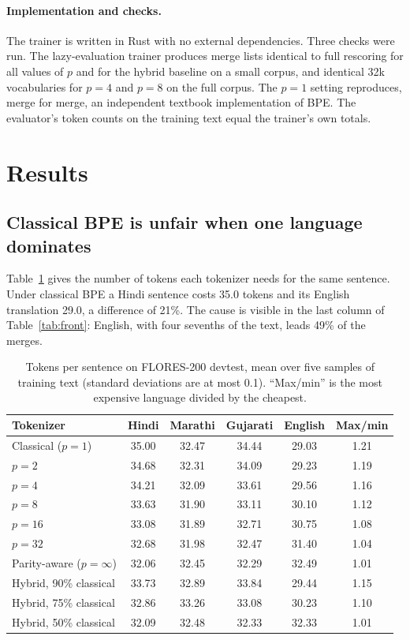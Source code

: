 \documentclass[11pt,a4paper]{article}
\theoremstyle{remark}
\begin{document}
\paragraph{Implementation and checks.}
The trainer is written in Rust with no external dependencies. Three checks were run.
The lazy-evaluation trainer produces merge lists identical to full rescoring for all values
of $p$ and for the hybrid baseline on a small corpus, and identical 32k vocabularies for
$p=4$ and $p=8$ on the full corpus. The $p=1$ setting reproduces, merge for merge, an
independent textbook implementation of BPE. The evaluator's token counts on the training
text equal the trainer's own totals.

\section{Results}\label{sec:results}

\subsection{Classical BPE is unfair when one language dominates}

Table~\ref{tab:perlang} gives the number of tokens each tokenizer needs for the same
sentence. Under classical BPE a Hindi sentence costs 35.0 tokens and its English
translation 29.0, a difference of 21\%. The cause is visible in the last column of
Table~\ref{tab:front}: English, with four sevenths of the text, leads 49\% of the merges.

\begin{table}[t]
\centering
\caption{Tokens per sentence on FLORES-200 devtest, mean over five samples of training
text (standard deviations are at most 0.1). ``Max/min'' is the most expensive language
divided by the cheapest.}
\label{tab:perlang}
\begin{tabular}{lccccc}
\toprule
Tokenizer & Hindi & Marathi & Gujarati & English & Max/min\\
\midrule
Classical ($p=1$) & 35.00 & 32.47 & 34.44 & 29.03 & 1.21\\
$p=2$  & 34.68 & 32.31 & 34.09 & 29.23 & 1.19\\
$p=4$  & 34.21 & 32.09 & 33.61 & 29.56 & 1.16\\
$p=8$  & 33.63 & 31.90 & 33.11 & 30.10 & 1.12\\
$p=16$ & 33.08 & 31.89 & 32.71 & 30.75 & 1.08\\
$p=32$ & 32.68 & 31.98 & 32.47 & 31.40 & 1.04\\
Parity-aware ($p=\infty$) & 32.06 & 32.45 & 32.29 & 32.49 & 1.01\\
\midrule
Hybrid, 90\% classical & 33.73 & 32.89 & 33.84 & 29.44 & 1.15\\
Hybrid, 75\% classical & 32.86 & 33.26 & 33.08 & 30.23 & 1.10\\
Hybrid, 50\% classical & 32.09 & 32.48 & 32.33 & 32.33 & 1.01\\
\bottomrule
\end{tabular}
\end{table}
\end{document}
